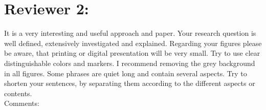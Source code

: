 \documentclass{article}
\begin{document}

\section*{Reviewer 2:}

It is a very interesting and useful approach and paper. Your research question is well defined, extensively investigated and explained. Regarding your figures please be aware, that printing or digital presentation will be very small. Try to use clear distinguishable colors and markers. I recommend removing the grey background in all figures. Some phrases are quiet long and contain several aspects. Try to shorten your sentences, by separating them according to the different aspects or contents.\\

Comments:\\
\end{document}
